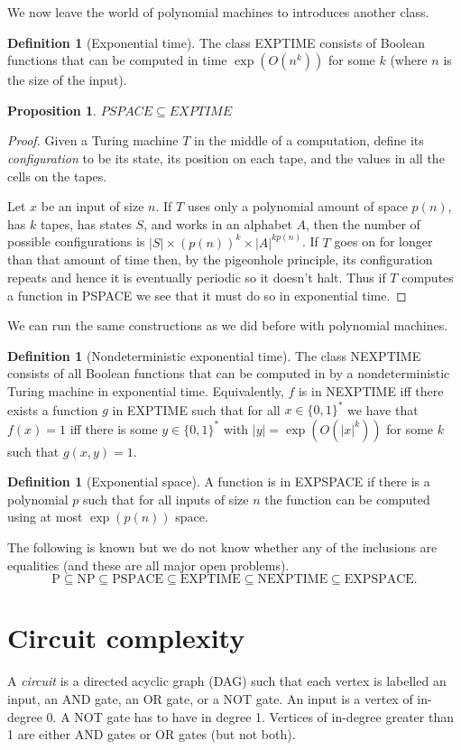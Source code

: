 \documentclass{report}
\theoremstyle{definition}
\theoremstyle{plain}
\newtheorem{prop}[thm]{Proposition}
\theoremstyle{definition}
\newtheorem{defn}[thm]{Definition}
\begin{document}
	We now leave the world of polynomial machines to introduces another class.
	\begin{defn}[Exponential time]
		The class EXPTIME consists of Boolean functions that can be computed in time $\exp(O(n^k))$ for some $k$ (where $n$ is the size of the input).
	\end{defn}
	\begin{prop}
		$PSPACE \subseteq EXPTIME$
	\end{prop}
	\begin{proof}
		Given a Turing machine $T$ in the middle of a computation, define its \emph{configuration} to be its state, its position on each tape, and the values in all the cells on the tapes.
		
		Let $x$ be an input of size $n$. If $T$ uses only a polynomial amount of space $p(n)$, has $k$ tapes, has states $S$, and works in an alphabet $A$, then the number of possible configurations is $|S|\times (p(n))^k \times |A|^{kp(n)}$. If $T$ goes on for longer than that amount of time then, by the pigeonhole principle, its configuration repeats and hence it is eventually periodic so it doesn't halt. Thus if $T$ computes a function in PSPACE we see that it must do so in exponential time.
	\end{proof}
	We can run the same constructions as we did before with polynomial machines.
	\begin{defn}[Nondeterministic exponential time]
		The class NEXPTIME consists of all Boolean functions that can be computed in by a nondeterministic Turing machine in exponential time. Equivalently, $f$ is in NEXPTIME iff there exists a function $g$ in EXPTIME such that for all $x\in\{0,1\}^*$ we have that $f(x) = 1$ iff there is some $y\in\{0,1\}^{*}$ with $|y| = \exp(O(|x|^k))$ for some $k$ such that $g(x,y) = 1$.
	\end{defn}
	\begin{defn}[Exponential space]
		A function is in EXPSPACE if there is a polynomial $p$ such that for all inputs of size $n$ the function can be computed using at most $\exp(p(n))$ space.
	\end{defn}
	The following is known but we do not know whether any of the inclusions are equalities (and these are all major open problems).
	\[
		\text{P}\subseteq\text{NP}\subseteq \text{PSPACE}\subseteq \text{EXPTIME}\subseteq \text{NEXPTIME}\subseteq \text{EXPSPACE}.
	\]
	\section{Circuit complexity}
	A \emph{circuit} is a directed acyclic graph (DAG) such that each vertex is labelled an input, an AND gate, an OR gate, or a NOT gate. An input is a vertex of in-degree 0. A NOT gate has to have in degree 1. Vertices of in-degree greater than 1 are either AND gates or OR gates (but not both).
	
\end{document}
